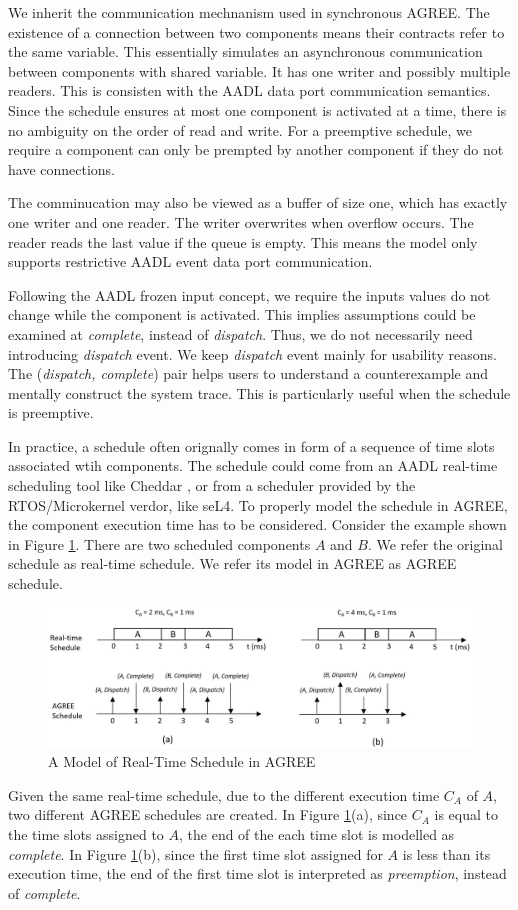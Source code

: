 We inherit the communication mechnanism used in synchronous AGREE. The existence of a connection between two components means their contracts refer to the same variable. 
This essentially simulates an asynchronous communication between components with shared variable. It has one writer and possibly multiple readers. This is consisten with the AADL data port communication semantics.
Since the schedule ensures at most one component is activated at a time, there is no ambiguity on the order of read and write. For a preemptive schedule, we require a component can only be prempted by another component if they do not have connections.

The comminucation may also be viewed as a buffer of size one, which has exactly one writer and one reader. The writer overwrites when overflow occurs. The reader reads the last value if the queue is empty. This means the model only supports restrictive AADL event data port communication.

Following the AADL frozen input concept, we require the inputs values do not change while the component is activated. This implies assumptions could be examined at \emph{complete}, instead of \emph{dispatch}. Thus, we do not necessarily need introducing \emph{dispatch} event. We keep \emph{dispatch} event mainly for usability reasons. The (\emph{dispatch, complete}) pair helps users to understand a counterexample and mentally construct the system trace. This is particularly useful when the schedule is preemptive.

In practice, a schedule often orignally comes in form of a sequence of time slots associated wtih components. 
The schedule could come from an AADL real-time scheduling tool like Cheddar \cite{cheddar}, or from a scheduler provided by the RTOS/Microkernel verdor, like seL4\cite{seL4}. 
To properly model the schedule in AGREE, the component execution time has to be considered. Consider the example shown in Figure \ref{RTschedule}. There are two scheduled components $A$ and $B$. We refer the original schedule as real-time schedule. We refer its model in AGREE as AGREE schedule.
\begin{figure}[ht!]
\centering
\includegraphics[width=130mm]{RTschedule.jpg}
\caption{A Model of Real-Time Schedule in AGREE\label{RTschedule}}
\end{figure}
Given the same real-time schedule, due to the different execution time $C_A$ of $A$, two different AGREE schedules are created. In Figure \ref{RTschedule}(a), since $C_A$ is equal to the time slots assigned to $A$, the end of the each time slot is modelled as \emph{complete}. In Figure \ref{RTschedule}(b), since the first time slot assigned for $A$ is less than its execution time, the end of the first time slot is interpreted as \emph{preemption}, instead of \emph{complete}.

